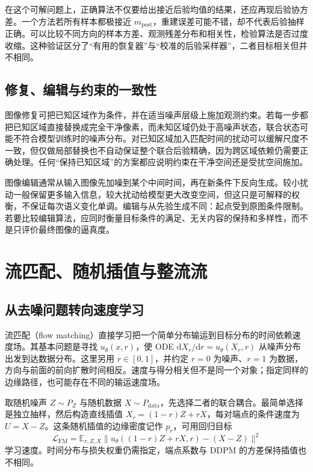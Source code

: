 \documentclass[UTF8,12pt,a4paper,fontset=fandol]{ctexart}
\begin{document}
在这个可解问题上，正确算法不仅要给出接近后验均值的结果，还应再现后验协方差。一个方法若所有样本都极接近 $m_{\mathrm{post}}$，重建误差可能不错，却不代表后验抽样正确。可以比较不同方向的样本方差、观测残差分布和相关性，检验算法是否过度收缩。这种验证区分了“有用的恢复器”与“校准的后验采样器”，二者目标相关但并不相同。

\subsection{修复、编辑与约束的一致性}
图像修复可把已知区域作为条件，并在适当噪声层级上施加观测约束。若每一步都把已知区域直接替换成完全干净像素，而未知区域仍处于高噪声状态，联合状态可能不符合模型训练时的噪声分布。对已知区域加入匹配时间的扰动可以缓解尺度不一致，但仅做局部替换也不自动保证整个联合后验精确，因为跨区域依赖仍需要正确处理。任何“保持已知区域”的方案都应说明约束在干净空间还是受扰空间施加。

图像编辑通常从输入图像先加噪到某个中间时间，再在新条件下反向生成。较小扰动一般保留更多输入信息，较大扰动给模型更大改变空间，但这只是可解释的权衡，不保证每次语义变化单调。编辑与从先验生成不同：起点受到原图条件限制。若要比较编辑算法，应同时衡量目标条件的满足、无关内容的保持和多样性，而不是只评价最终图像的逼真度。

\section{流匹配、随机插值与整流流}
\label{sec:diff-flow}
\subsection{从去噪问题转向速度学习}
流匹配（flow matching）直接学习把一个简单分布输运到目标分布的时间依赖速度场\cite{lipman2023}。其基本问题是寻找 $u_\theta(x,r)$，使 ODE $\mathrm dX_r/\mathrm dr=u_\theta(X_r,r)$ 从噪声分布出发到达数据分布。这里另用 $r\in[0,1]$，并约定 $r=0$ 为噪声、$r=1$ 为数据，方向与前面的前向扩散时间相反。速度与得分相关但不是同一个对象；指定同样的边缘路径，也可能存在不同的输运速度场。

取随机噪声 $Z\sim P_Z$ 与随机数据 $X\sim P_{\mathrm{data}}$，先选择二者的联合耦合。最简单选择是独立抽样，然后构造直线插值 $X_r=(1-r)Z+rX$，每对端点的条件速度为 $U=X-Z$。这条随机插值的边缘密度记作 $p_r$，可用回归目标
\begin{equation}
 \mathcal L_{\mathrm{FM}}=\mathbb E_{r,Z,X}\|u_\theta((1-r)Z+rX,r)-(X-Z)\|^2
 \label{eq:diff-flow-loss}
\end{equation}
学习速度。时间分布与损失权重仍需指定，端点系数与 DDPM 的方差保持插值也不相同。
\end{document}
